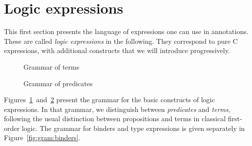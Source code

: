 \section{Logic expressions}
\label{sec:expressions}

This first section presents the language of expressions one can use in
annotations. These are called \emph{logic expressions} in the following. They
correspond to pure C expressions, with additional constructs
that we will introduce progressively.

\begin{figure}[t]
  \begin{cadre}
    
  \end{cadre}
  \caption{Grammar of terms}
\label{fig:gram:term}
\end{figure}

\begin{figure}[hb]
  \begin{cadre}
    
  \end{cadre}
  \caption{Grammar of predicates}
\label{fig:gram:pred}
\end{figure}

Figures~\ref{fig:gram:term}~and~\ref{fig:gram:pred} present the
grammar for the basic constructs of logic expressions. In that
grammar, we distinguish between \emph{predicates} and
\emph{terms}, following the usual distinction between
propositions and terms in classical first-order logic. The grammar
for binders and type expressions is given separately in
Figure~\ref{fig:gram:binders}.

